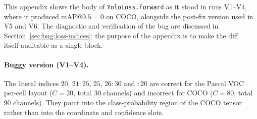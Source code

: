 
This appendix shows the body of \texttt{YoloLoss.forward} as it stood in
runs V1--V4, where it produced $\mathrm{mAP}@0.5 = 0$ on COCO, alongside the
post-fix version used in V5 and V6. The diagnostic and verification of the
bug are discussed in Section~\ref{sec:bug:loss-indices}; the purpose of the
appendix is to make the diff itself auditable as a single block.

\paragraph{Buggy version (V1--V4).} The literal indices $20$, $21\!:\!25$,
$25$, $26\!:\!30$ and $:\!20$ are correct for the Pascal VOC per-cell layout
($C\!=\!20$, total $30$ channels) and incorrect for COCO ($C\!=\!80$, total
$90$ channels). They point into the class-probability region of the COCO
tensor rather than into the coordinate and confidence slots.

